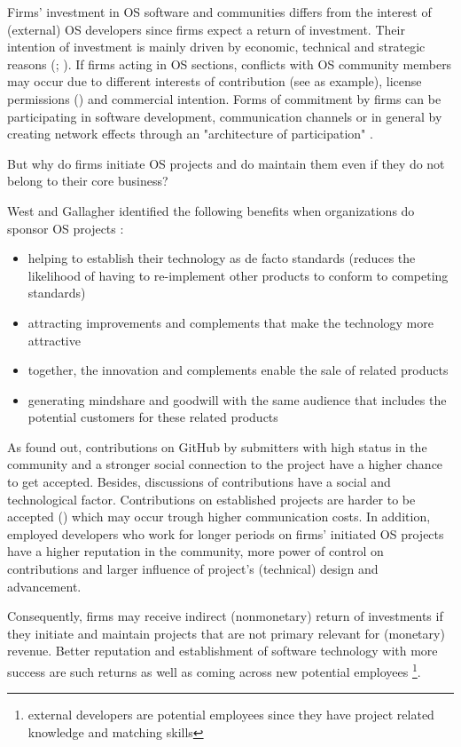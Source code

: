 Firms' investment in OS software and communities differs from the interest of (external) OS developers since firms expect a return of investment. Their intention of investment is mainly driven by economic, technical and strategic reasons (\cite{wichmann2002free}; \cite{henkel2006selective}). If firms acting in OS sections, conflicts with OS community members may occur due to different interests of contribution (see \cite{IveJustLiberatedMyModules:online} as example), license permissions (\cite{hars2001working}) and commercial intention. Forms of commitment by firms can be participating in software development, communication channels or in general by creating network effects through an "architecture of participation" \cite[p.22]{o2007web}.

But why do firms initiate OS projects and do maintain them even if they do not belong to their core business?

West and Gallagher identified the following benefits when organizations do sponsor OS projects \cite[p.13]{west2006challenges}:

\begin{itemize}
	\item helping to establish their technology as de facto standards (reduces the likelihood of having to re-implement other products to conform to competing standards)
	\item attracting improvements and complements that make the technology more attractive
	\item together, the innovation and complements enable the sale of related products
	\item generating mindshare and goodwill with the same audience that includes the potential
customers for these related products
\end{itemize}

As \cite{tsay2014influence} found out, contributions on GitHub by submitters with high status in the community and a stronger social connection to the project have a higher chance to get accepted. Besides, discussions of contributions have a social and technological factor. Contributions on established projects are harder to be accepted (\cite{tsay2014influence}) which may occur trough higher communication costs. In addition, employed developers who work for longer periods on firms' initiated OS projects have a higher reputation in the community, more power of control on contributions and larger influence of project's (technical) design and advancement.

Consequently, firms may receive indirect (nonmonetary) return of investments if they initiate and maintain projects that are not primary relevant for (monetary) revenue. Better reputation and establishment of software technology with more success are such returns as well as coming across new potential employees \footnote{external developers are potential employees since they have project related knowledge and matching skills}.


